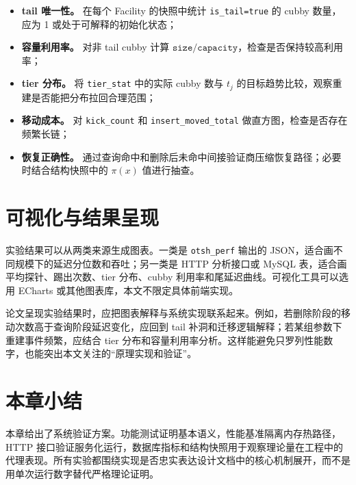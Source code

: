 \begin{itemize}
  \item \textbf{tail 唯一性。} 在每个 Facility 的快照中统计 \texttt{is\_tail=true} 的 cubby 数量，应为 1 或处于可解释的初始化状态；
  \item \textbf{容量利用率。} 对非 tail cubby 计算 \(\texttt{size}/\texttt{capacity}\)，检查是否保持较高利用率；
  \item \textbf{tier 分布。} 将 \texttt{tier\_stat} 中的实际 cubby 数与 \(t_j\) 的目标趋势比较，观察重建是否能把分布拉回合理范围；
  \item \textbf{移动成本。} 对 \texttt{kick\_count} 和 \texttt{insert\_moved\_total} 做直方图，检查是否存在频繁长链；
  \item \textbf{恢复正确性。} 通过查询命中和删除后未命中间接验证商压缩恢复路径；必要时结合结构快照中的 \(\pi(x)\) 值进行抽查。
\end{itemize}

\section{可视化与结果呈现}
实验结果可以从两类来源生成图表。一类是 \texttt{otsh\_perf} 输出的 JSON，适合画不同规模下的延迟分位数和吞吐；另一类是 HTTP 分析接口或 MySQL 表，适合画平均探针、踢出次数、tier 分布、cubby 利用率和尾延迟曲线。可视化工具可以选用 ECharts\cite{echarts} 或其他图表库，本文不限定具体前端实现。

论文呈现实验结果时，应把图表解释与系统实现联系起来。例如，若删除阶段的移动次数高于查询阶段延迟变化，应回到 tail 补洞和迁移逻辑解释；若某组参数下重建事件频繁，应结合 tier 分布和容量利用率分析。这样能避免只罗列性能数字，也能突出本文关注的“原理实现和验证”。

\section{本章小结}
本章给出了系统验证方案。功能测试证明基本语义，性能基准隔离内存热路径，HTTP 接口验证服务化运行，数据库指标和结构快照用于观察理论量在工程中的代理表现。所有实验都围绕实现是否忠实表达设计文档中的核心机制展开，而不是用单次运行数字替代严格理论证明。